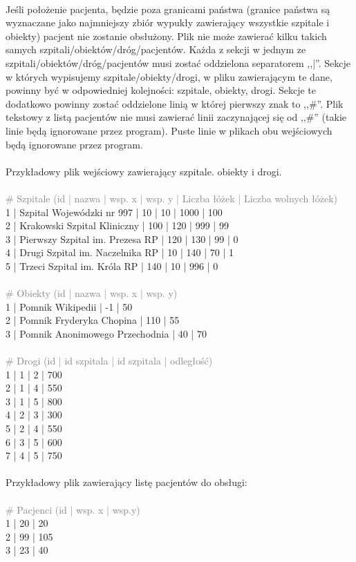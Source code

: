 \documentclass[]{article}
\begin{document}
    \\
    Jeśli położenie pacjenta, będzie poza granicami państwa (granice państwa są wyznaczane jako najmniejszy zbiór wypukły zawierający wszystkie szpitale i obiekty) pacjent nie zostanie obsłużony.
    Plik nie może zawierać kilku takich samych szpitali/obiektów/dróg/pacjentów.
    Każda z sekcji w jednym ze szpitali/obiektów/dróg/pacjentów musi zostać oddzielona separatorem ,,|''.
    Sekcje w których wypisujemy szpitale/obiekty/drogi, w pliku zawierającym te dane, powinny być w odpowiedniej kolejności: szpitale, obiekty, drogi.
    Sekcje te dodatkowo powinny zostać oddzielone linią w której pierwszy znak to ,,\#''.
    Plik tekstowy z listą pacjentów nie musi zawierać linii zaczynającej się od ,,\#'' (takie linie będą ignorowane przez program).
    Puste linie w plikach obu wejściowych będą ignorowane przez program. \\
    \\
    Przykładowy plik wejściowy zawierający szpitale. obiekty i drogi. \\
    \\
    \textcolor{gray}{\# Szpitale (id | nazwa | wsp. x | wsp. y | Liczba łóżek | Liczba wolnych łóżek)} \\
    1 | Szpital Wojewódzki nr 997 | 10 | 10 | 1000 | 100 \\
    2 | Krakowski Szpital Kliniczny | 100 | 120 | 999 | 99 \\
    3 | Pierwszy Szpital im. Prezesa RP | 120 | 130 | 99 | 0 \\
    4 | Drugi Szpital im. Naczelnika RP | 10 | 140 | 70 | 1 \\
    5 | Trzeci Szpital im. Króla RP | 140 | 10 | 996 | 0 \\
    \\
    \textcolor{gray}{\# Obiekty (id | nazwa | wsp. x | wsp. y)} \\
    1 | Pomnik Wikipedii | -1 | 50 \\
    2 | Pomnik Fryderyka Chopina | 110 | 55 \\
    3 | Pomnik Anonimowego Przechodnia | 40 | 70 \\
    \\
    \textcolor{gray}{\# Drogi (id | id szpitala | id szpitala | odległość)} \\
    1 | 1 | 2 | 700 \\
    2 | 1 | 4 | 550 \\
    3 | 1 | 5 | 800 \\
    4 | 2 | 3 | 300 \\
    5 | 2 | 4 | 550 \\
    6 | 3 | 5 | 600 \\
    7 | 4 | 5 | 750 \\
    \\
    Przykładowy plik zawierający listę pacjentów do obsługi: \\
    \\
    \textcolor{gray}{\# Pacjenci (id | wsp. x | wsp.y)} \\
    1 | 20 | 20 \\
    2 | 99 | 105 \\
    3 | 23 | 40 \\
    
\end{document}
